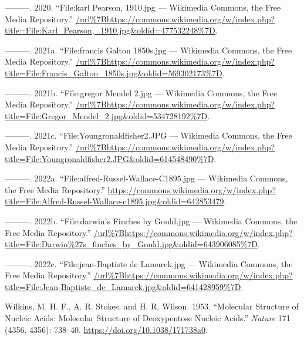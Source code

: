 \documentclass[
]{book}
\newlength{\cslhangindent}
\newlength{\cslentryspacingunit} %
\newenvironment{CSLReferences}[2] %
 {%
  \setlength{\parindent}{0pt}
  \ifodd #1
  \let\oldpar\par
  \def\par{\hangindent=\cslhangindent\oldpar}
  \fi
  \setlength{\parskip}{#2\cslentryspacingunit}
 }%
 {}
\begin{document}
\begin{CSLReferences}{1}{0}
\leavevmode{}%
---------. 2020. {``File:karl Pearson, 1910.jpg --- Wikimedia Commons{,} the Free Media Repository.''} \url{/url\%7Bhttps://commons.wikimedia.org/w/index.php?title=File:Karl_Pearson,_1910.jpg\&oldid=477532248\%7D}.

\leavevmode{}%
---------. 2021a. {``File:francis Galton 1850s.jpg --- Wikimedia Commons{,} the Free Media Repository.''} \url{/url\%7Bhttps://commons.wikimedia.org/w/index.php?title=File:Francis_Galton_1850s.jpg\&oldid=569302173\%7D}.

\leavevmode{}%
---------. 2021b. {``File:gregor Mendel 2.jpg --- Wikimedia Commons{,} the Free Media Repository.''} \url{/url\%7Bhttps://commons.wikimedia.org/w/index.php?title=File:Gregor_Mendel_2.jpg\&oldid=534728192\%7D}.

\leavevmode{}%
---------. 2021c. {``File:Youngronaldfisher2.JPG --- Wikimedia Commons{,} the Free Media Repository.''} \url{/url\%7Bhttps://commons.wikimedia.org/w/index.php?title=File:Youngronaldfisher2.JPG\&oldid=614548490\%7D}.

\leavevmode{}%
---------. 2022a. {``File:alfred-Russel-Wallace-C1895.jpg --- Wikimedia Commons{,} the Free Media Repository.''} \url{https://commons.wikimedia.org/w/index.php?title=File:Alfred-Russel-Wallace-c1895.jpg\&oldid=642853479}.

\leavevmode{}%
---------. 2022b. {``File:darwin's Finches by Gould.jpg --- Wikimedia Commons{,} the Free Media Repository.''} \url{/url\%7Bhttps://commons.wikimedia.org/w/index.php?title=File:Darwin\%27s_finches_by_Gould.jpg\&oldid=643906085\%7D}.

\leavevmode{}%
---------. 2022c. {``File:jean-Baptiste de Lamarck.jpg --- Wikimedia Commons{,} the Free Media Repository.''} \url{/url\%7Bhttps://commons.wikimedia.org/w/index.php?title=File:Jean-Baptiste_de_Lamarck.jpg\&oldid=641428959\%7D}.

\leavevmode{}%
Wilkins, M. H. F., A. R. Stokes, and H. R. Wilson. 1953. {``Molecular {Structure} of {Nucleic Acids}: {Molecular Structure} of {Deoxypentose Nucleic Acids}.''} \emph{Nature} 171 (4356, 4356): 738--40. \url{https://doi.org/10.1038/171738a0}.


\end{CSLReferences}
\end{document}
